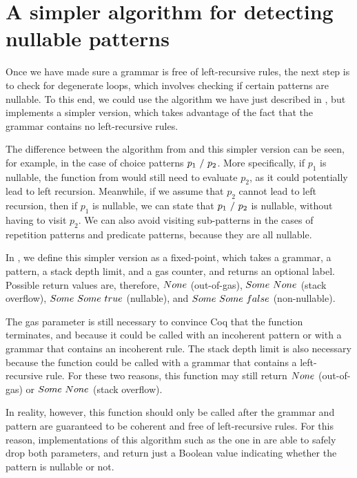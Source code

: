 \section{A simpler algorithm for detecting nullable patterns}
\label{section:nullable}

Once we have made sure a grammar is free of left-recursive rules,
the next step is to check for degenerate loops,
which involves checking if certain patterns are nullable.
To this end,
we could use the algorithm we have just described in ,
but \lpeg{} implements a simpler version,
which takes advantage of the fact that
the grammar contains no left-recursive rules.

The difference between the algorithm from 
and this simpler version can be seen,
for example, in the case of choice patterns $p_1\ /\ p_2$.
More specifically, if $p_1$ is nullable,
the function from 
would still need to evaluate $p_2$,
as it could potentially lead to left recursion.
Meanwhile, if we assume that $p_2$ cannot lead to left recursion,
then if $p_1$ is nullable,
we can state that $p_1\ /\ p_2$ is nullable,
without having to visit $p_2$.
We can also avoid visiting sub-patterns in the cases of
repetition patterns and predicate patterns,
because they are all nullable.

In ,
we define this simpler version as a fixed-point,
which takes a grammar,
a pattern, a stack depth limit, and a gas counter,
and returns an optional label.
Possible return values are, therefore,
$None$ (out-of-gas), $Some\ None$ (stack overflow),
$Some\ Some\ true$ (nullable), and $Some\ Some\ false$ (non-nullable).

The gas parameter is still necessary to convince Coq that
the function terminates,
and because it could be called
with an incoherent pattern or
with a grammar that contains an incoherent rule.
The stack depth limit is also necessary
because the function could be called
with a grammar that contains a left-recursive rule.
For these two reasons,
this function
may still return $None$ (out-of-gas)
or $Some\ None$ (stack overflow).

In reality, however,
this function should only be called after
the grammar and pattern are guaranteed to be
coherent and free of left-recursive rules.
For this reason,
implementations of this algorithm
such as the one in \lpeg{}
are able to safely drop both parameters,
and return just a Boolean value
indicating whether the pattern is nullable or not.

